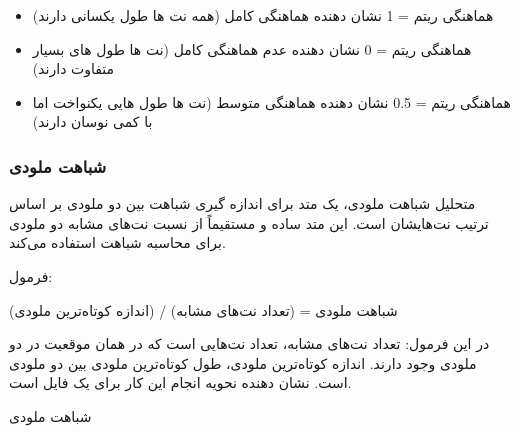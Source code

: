 \begin{itemize}
      \item هماهنگی ریتم = 1 نشان دهنده هماهنگی کامل (همه نت ها طول یکسانی دارند)
      \item هماهنگی ریتم = 0 نشان دهنده عدم هماهنگی کامل (نت ها طول های بسیار متفاوت دارند)
      \item هماهنگی ریتم = 0.5 نشان دهنده هماهنگی متوسط (نت ها طول هایی یکنواخت اما با کمی نوسان دارند)
\end{itemize}

\subsubsection{ شباهت ملودی }

متحلیل شباهت ملودی، یک متد برای اندازه گیری شباهت بین دو ملودی بر اساس ترتیب نت‌هایشان است. این متد ساده و مستقیماً از نسبت نت‌های مشابه دو ملودی برای محاسبه شباهت استفاده می‌کند.

فرمول:

شباهت ملودی = (تعداد نت‌های مشابه) / (اندازه کوتاه‌ترین ملودی)

در این فرمول:
تعداد نت‌های مشابه، تعداد نت‌هایی است که در همان موقعیت در دو ملودی وجود دارند.
اندازه کوتاه‌ترین ملودی، طول کوتاه‌ترین ملودی بین دو ملودی است.
 نشان دهنده نحویه انجام این کار برای یک فایل  است. 

\begin{LTR}
      \begin{algorithm}
            \caption{شباهت ملودی }
            \setmainfont{Times New Roman}
            \label{alg:analyze_melodic_similarity}
            \begin{algorithmic}
            \end{algorithmic}
      \end{algorithm}
\end{LTR}
